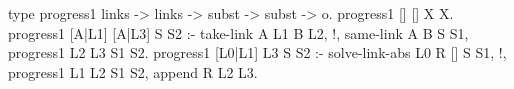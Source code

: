   type progress1 links -> links -> subst -> subst -> o.
  progress1 [] [] X X.
  progress1 [A|L1] [A|L3] S S2 :- take-link A L1 B L2, !,
    same-link A B S S1, 
    progress1 L2 L3 S1 S2.
  progress1 [L0|L1] L3 S S2 :-
    solve-link-abs L0 R [] S S1, !,
    progress1 L1 L2 S1 S2, append R L2 L3.
